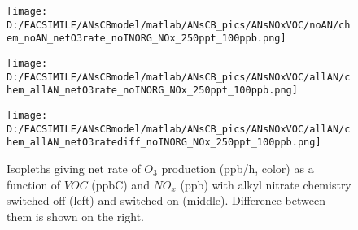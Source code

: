 \documentclass[11pt,a4paper]{article}
\begin{document}
\begin{figure} %
\centering
\begin{minipage}{.3\textwidth}
  \centering
  \texttt{[image: D:/FACSIMILE/ANsCBmodel/matlab/ANsCB\_pics/ANsNOxVOC/noAN/chem\_noAN\_netO3rate\_noINORG\_NOx\_250ppt\_100ppb.png]}
\end{minipage}
\begin{minipage}{.3\textwidth}
  \centering
  \texttt{[image: D:/FACSIMILE/ANsCBmodel/matlab/ANsCB\_pics/ANsNOxVOC/allAN/chem\_allAN\_netO3rate\_noINORG\_NOx\_250ppt\_100ppb.png]}
\end{minipage}
\begin{minipage}{.3\textwidth}
  \centering
  \texttt{[image: D:/FACSIMILE/ANsCBmodel/matlab/ANsCB\_pics/ANsNOxVOC/allAN/chem\_allAN\_netO3ratediff\_noINORG\_NOx\_250ppt\_100ppb.png]}
\end{minipage}
\caption{Isopleths giving net rate of $O_3$ production (ppb/h, color) as a function of $VOC$ (ppbC) and $NO_x$ (ppb) with alkyl nitrate chemistry switched off (left) and switched on (middle). Difference between them is shown on the right.}\label{fig:netO3rate_noAN_withAN_diff}
\end{figure}
\end{document}
